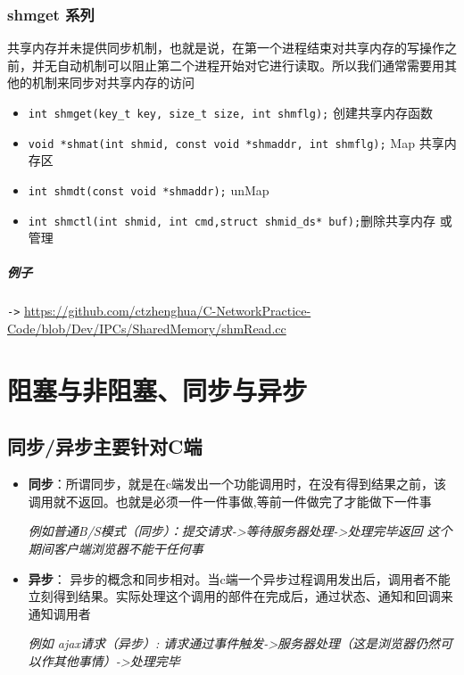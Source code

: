 \documentclass[UTF8,a4paper,12pt]{ctexbook}
\begin{document}
		\subsubsection{shmget 系列}
			共享内存并未提供同步机制，也就是说，在第一个进程结束对共享内存的写操作之前，并无自动机制可以阻止第二个进程开始对它进行读取。所以我们通常需要用其他的机制来同步对共享内存的访问
			
			\begin{itemize}
				\item \verb|int shmget(key_t key, size_t size, int shmflg);| 创建共享内存函数
				\item \verb|void *shmat(int shmid, const void *shmaddr, int shmflg);| Map 共享内存区
				\item \verb|int shmdt(const void *shmaddr);| unMap
				\item \verb|int shmctl(int shmid, int cmd,struct shmid_ds* buf);|删除共享内存  或管理
			\end{itemize}
			
			\subparagraph{例子}\verb|->|
				\url{https://github.com/ctzhenghua/C-NetworkPractice-Code/blob/Dev/IPCs/SharedMemory/shmRead.cc}
			
	\section{阻塞与非阻塞、同步与异步}
		\subsection{同步/异步主要针对C端}
			\begin{itemize}
				\item \textbf{同步}：所谓同步，就是在c端发出一个功能调用时，在没有得到结果之前，该调用就不返回。也就是必须一件一件事做,等前一件做完了才能做下一件事
				
				\textit{例如普通B/S模式（同步）：提交请求->等待服务器处理->处理完毕返回 这个期间客户端浏览器不能干任何事}
				\item \textbf{异步}：  异步的概念和同步相对。当c端一个异步过程调用发出后，调用者不能立刻得到结果。实际处理这个调用的部件在完成后，通过状态、通知和回调来通知调用者
				
				\textit{例如 ajax请求（异步）: 请求通过事件触发->服务器处理（这是浏览器仍然可以作其他事情）->处理完毕}
			\end{itemize}
		
\end{document}
